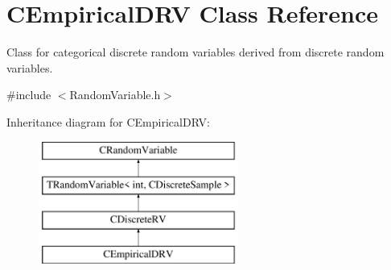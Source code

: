\hypertarget{class_c_empirical_d_r_v}{\section{C\-Empirical\-D\-R\-V Class Reference}
\label{class_c_empirical_d_r_v}
}


Class for categorical discrete random variables derived from discrete random variables.  




{\ttfamily \#include $<$Random\-Variable.\-h$>$}

Inheritance diagram for C\-Empirical\-D\-R\-V\-:\begin{figure}[H]
\begin{center}
\leavevmode
\includegraphics[height=4.000000cm]{class_c_empirical_d_r_v}
\end{center}
\end{figure}
